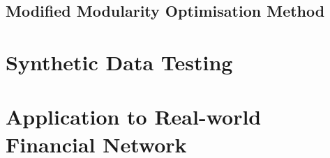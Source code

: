 
\subsection{Modified Modularity Optimisation Method}
\label{subsec:modifiedModularityOptimisationMethod}



\section{Synthetic Data Testing}
\label{sec:syntheticDataTesting}



\section{Application to Real-world Financial Network}
\label{sec:applicationToRealWorldFinancialNetwork}